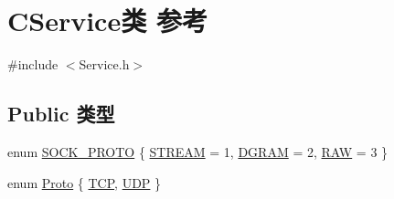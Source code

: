 \hypertarget{class_c_service}{}\section{C\+Service类 参考}
\label{class_c_service}


{\ttfamily \#include $<$Service.\+h$>$}

\subsection*{Public 类型}
\begin{DoxyCompactItemize}
\item 
enum \hyperlink{class_c_service_abd1684d960aef251b1d74edf372c5d1b}{S\+O\+C\+K\+\_\+\+P\+R\+O\+TO} \{ \hyperlink{class_c_service_abd1684d960aef251b1d74edf372c5d1ba479167516419221933e0143b80a50152}{S\+T\+R\+E\+AM} = 1, 
\hyperlink{class_c_service_abd1684d960aef251b1d74edf372c5d1bafda42db5e2e8f056a2efd03bfa0f3e96}{D\+G\+R\+AM} = 2, 
\hyperlink{class_c_service_abd1684d960aef251b1d74edf372c5d1bab25fd2485455ea631949e45849c7c390}{R\+AW} = 3
 \}
\item 
enum \hyperlink{class_c_service_a43fb60063bc9f9b0f4e3eeb1787056b0}{Proto} \{ \hyperlink{class_c_service_a43fb60063bc9f9b0f4e3eeb1787056b0a69fdc51ce4262393db36351c381d86a9}{T\+CP}, 
\hyperlink{class_c_service_a43fb60063bc9f9b0f4e3eeb1787056b0ac45d78d4edd8c6f5d27519dffc61f001}{U\+DP}
 \}
\end{DoxyCompactItemize}
